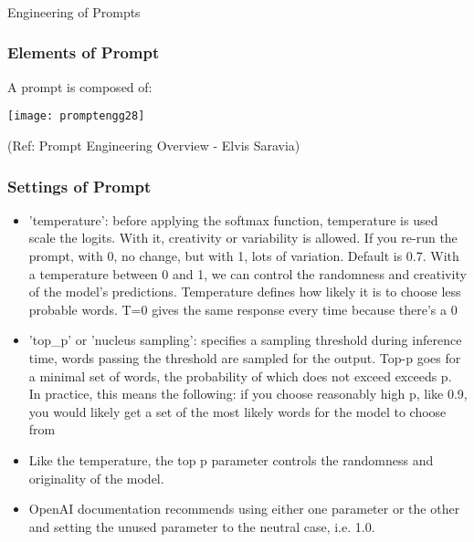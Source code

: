 \begin{frame}[fragile]\frametitle{}
\begin{center}
{\Large Engineering of Prompts}
\end{center}
\end{frame}

\begin{frame}[fragile]\frametitle{Elements of Prompt}

A prompt is composed of:

\begin{center}
\texttt{[image: promptengg28]}

{\tiny (Ref: Prompt Engineering Overview - Elvis Saravia)}

\end{center}		
		
\end{frame}


\begin{frame}[fragile]\frametitle{Settings of Prompt}

\begin{itemize}
\item 'temperature':  before applying the softmax function, temperature is used scale the logits. With it, creativity or variability is allowed. If you re-run the prompt, with 0, no change, but with 1, lots of variation. Default is 0.7. With a temperature between 0 and 1, we can control the randomness and creativity of the model's predictions. Temperature defines how likely it is to choose less probable words. T=0 gives the same response every time because there's a 0%
\item 'top\_p' or 'nucleus sampling': specifies a sampling threshold during inference time, words passing the threshold are sampled for the output. Top-p goes for a minimal set of words, the probability of which does not exceed exceeds p. In practice, this means the following: if you choose reasonably high p, like 0.9, you would likely get a set of the most likely words for the model to choose from
\item Like the temperature, the top p parameter controls the randomness and originality of the model.
\item OpenAI documentation recommends using either one parameter or the other and setting the unused parameter to the neutral case, i.e. 1.0.
\end{itemize}
		
\end{frame}


